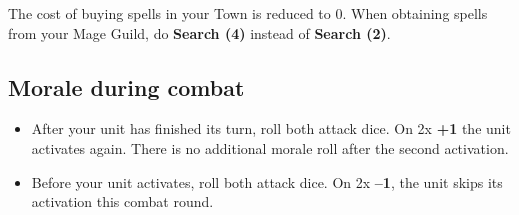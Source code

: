 \begin{multicols*}{2}
{\expert} The cost of buying spells in your Town is reduced to 0. When obtaining spells from your Mage Guild, 
do \textbf{Search (4)} instead of \textbf{Search (2)}.

\subsection*{Morale during combat}

\begin{itemize}
    \item {\moralepos} After your unit has finished its turn, roll both attack dice. On 2x \textbf{+1} the unit activates again.
    There is no additional morale roll after the second activation.
    \item {\moraleneg} Before your unit activates, roll both attack dice. On 2x \textbf{--1}, the unit skips its activation this combat round.
\end{itemize}

\vfill

\end{multicols*}
